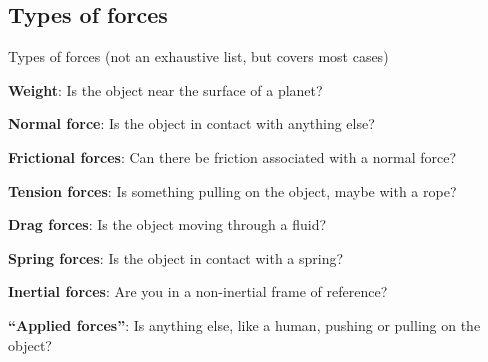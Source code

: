 \documentclass[aspectratio=169,
hyperref={colorlinks,urlcolor=blue}
]{beamer}
\begin{document}
\subsection{Types of forces}
\label{subsec:typesofforces}
\begin{bulletframe}{Types of forces (not an exhaustive list, but covers most cases)}
\item \textbf{Weight}: Is the object near the surface of a planet?
\item \textbf{Normal force}: Is the object in contact with anything else?
\item \textbf{Frictional forces}: Can there be friction associated with a normal force?
\item \textbf{Tension forces}: Is something pulling on the object, maybe with a rope?
\item \textbf{Drag forces}: Is the object moving through a fluid?
\item \textbf{Spring forces}: Is the object in contact with a spring?
\item \textbf{Inertial forces}: Are you in a non-inertial frame of reference?
\item \textbf{``Applied forces''}: Is anything else, like a human, pushing or pulling on the object?
\end{bulletframe}



\end{document}
